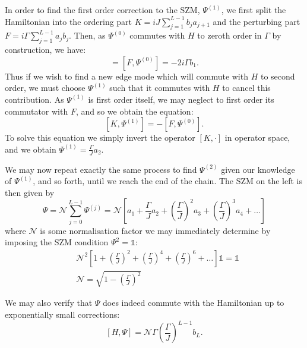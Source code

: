 \documentclass [a4paper, 11pt]{article}
\begin{document}
In order to find the first order correction to the SZM, $\Psi^{(1)}$, we first split the Hamiltonian into the ordering part $K =i J\sum_{j=1}^{L-1} b_j  a_{j+1}$ and the perturbing part $F= i \Gamma \sum_{j=1}^{L-1} a_j b_j$. Then, as $\Psi^{(0)}$ commutes with $H$ to zeroth order in $\Gamma$ by construction, we have:
\begin{equation}
 [H, \Psi^{(0)}] = [F, \Psi^{(0)}] = -2 i \Gamma b_1.\end{equation}
Thus if we wish to find a new edge mode which will commute with $H$ to second order, we must choose $\Psi^{(1)}$ such that it commutes with $H$ to cancel this contribution. As $\Psi^{(1)}$ is first order itself, we may neglect to first order its commutator with $F$, and so we obtain the equation:
\begin{equation}\label{eq:szmconstruct} [K, \Psi^{(1)}] = -[F, \Psi^{(0)}].\end{equation}
To solve this equation we simply invert the operator $[K, \cdot]$ in operator space, and we obtain $\Psi^{(1)} = \frac{\Gamma}{J} a_2$.

We may now repeat exactly the same process to find $\Psi^{(2)}$ given our knowledge of $\Psi^{(1)}$, and so forth, until we reach the end of the chain. The SZM on the left is then given by
\begin{equation}
\Psi = \mathcal{N} \sum_{j=0}^{L-1} \Psi^{(j)} =\mathcal{N} \left[ a_1 +  \frac{\Gamma}{J} a_2 +  \left(\frac{\Gamma}{J}\right)^2 a_3 + \left(\frac{\Gamma}{J}\right)^3 a_4 +\ldots \right]
\end{equation}
where $\mathcal{N}$ is some normalisation factor we may immediately determine by imposing the SZM condition $\Psi^2=\mathbb{1}$:
\begin{align}
&\mathcal{N}^2 \left[ 1 +  \left(\frac{\Gamma}{J}\right)^2 +  \left(\frac{\Gamma}{J}\right)^4 + \left(\frac{\Gamma}{J}\right)^6+\ldots \right] \mathbb{1} = \mathbb{1} \\
&\mathcal{N} = \sqrt{1-\left(\frac{\Gamma}{J}\right)^2}
\end{align}

We may also verify that $\Psi$ does indeed commute with the Hamiltonian up to exponentially small corrections:
\begin{equation}
  \label{eq:expsmall}
  [H, \Psi] = \mathcal{N} \Gamma \left(\frac{\Gamma}{J}\right)^{L-1} b_L.
\end{equation}
\end{document}
